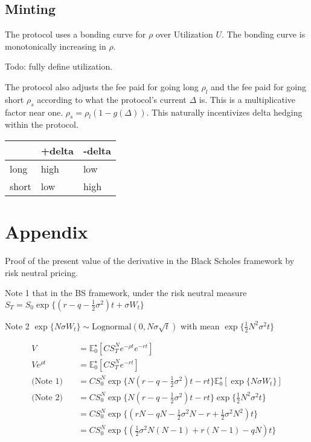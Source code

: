 \documentclass[12pt]{article}
\newcommand{\half}{\tfrac{1}{2}}
\begin{document}
    \subsection{Minting}

    The protocol uses a bonding curve for $\rho$ over Utilization $U$. The bonding curve is monotonically increasing in $\rho$.

    Todo: fully define utilization.

    The protocol also adjusts the fee paid for going long $\rho_l$ and the fee paid for going short $\rho_s$ according to what the protocol's current $\Delta$ is. This is a multiplicative factor near one. $\rho_s = \rho_l (1 - g(\Delta))$. This naturally incentivizes delta hedging within the protocol.

    \begin{center}
        \begin{tabular}{l||l|l}
            & +delta & -delta \\ \hline \hline
            long  & high   & low    \\ \hline
            short & low    & high
        \end{tabular}
    \end{center}


    \section{Appendix}

    Proof of the present value of the derivative in the Black Scholes framework by risk neutral pricing.

    Note 1 that in the BS framework, under the risk neutral measure $S_T = S_0 \exp \{ (r - q -\half\sigma^2)t + \sigma W_t \}$

    Note 2 $\exp \{ N\sigma W_t \} \sim \text{Lognormal}(0, N \sigma \sqrt{t})$ with mean $\exp \{ \half N^2 \sigma^2 t \}$

    \begin{align*}
        V  &= \mathbb{E}_0^{\star} \left[ C S_T^N e^{-\rho t} e^{-rt} \right] \\
        V e^{\rho t} &= \mathbb{E}_0^{\star} \left[ C S_T^N e^{-rt} \right] \\
        \text{(Note 1)}\quad&= C S_0^N  \exp \{ N(r - q -\half\sigma^2)t - rt \} \mathbb{E}_0^{\star} \left[ \exp \{ N\sigma W_t \} \right] \\
        \text{(Note 2)}\quad&= C S_0^N  \exp \{ N(r - q -\half\sigma^2)t - rt \} \exp \{ \half N^2 \sigma^2 t \} \\
        &= C S_0^N  \exp \{(rN - qN -\half\sigma^2 N - r + \half\sigma^2 N^2) t\} \\
        &= C S_0^N  \exp \{( \half\sigma^2 N (N-1) + r(N-1) - qN ) t\}
    \end{align*}
\end{document}
